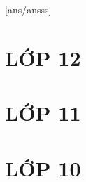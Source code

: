\documentclass[12pt,a4paper,oneside]{book}
\theoremstyle{nonumberplain}
\begin{document}
\tableofcontents
{}[ans/ansss]

\part{LỚP 12}










\part{LỚP 11}






\part{LỚP 10}





\end{document}
